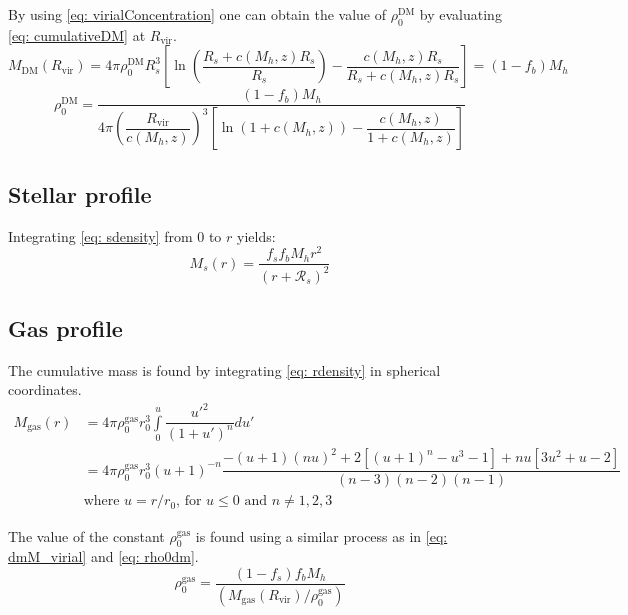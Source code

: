 		By using \autoref{eq: virialConcentration} one can obtain the value of $\rho_0^\text{DM}$ by evaluating \autoref{eq: cumulativeDM} at $R_\text{vir}$.
		\begin{equation}\label{eq: dmM_virial}
		M_\text{DM}(R_\text{vir}) = 4\pi\rho_0^\text{DM}R_s^3 \left[\ln\left(\dfrac{R_s + c(M_h, z)R_s}{R_s}\right) - \dfrac{c(M_h, z)R_s}{R_s + c(M_h, z)R_s}\right] = (1 - f_b)M_h
		\end{equation}
		\begin{equation}\label{eq: rho0dm}
		\rho_0^\text{DM} = \dfrac{(1 - f_b)M_h}{4\pi \left(\dfrac{R_\text{vir}}{c(M_h, z)}\right)^3 \left[\ln\left(1 + c(M_h, z)\right) - \dfrac{c(M_h, z)}{1 + c(M_h, z)}\right]}
		\end{equation}
	
	\subsection{Stellar profile}		
		Integrating \autoref{eq: sdensity} from $0$ to $r$ yields:
		\begin{equation}
			M_s(r) = \dfrac{f_sf_bM_h r^2}{(r + \mathcal{R}_s)^2}
		\end{equation}
	
	\subsection{Gas profile}		
		The cumulative mass is found by integrating \autoref{eq: rdensity} in spherical coordinates.
		\begin{equation}
			\begin{array}{rl}
			M_\text{gas}(r) 
			& = 4\pi\rho_0^\text{gas} r_0^3\int\limits_{0}^{u}\dfrac{u'^2}{(1 + u')^n}du' \\
			& = 4\pi\rho_0^\text{gas} r_0^3\left(u + 1\right)^{-n}\dfrac{-(u + 1)(nu)^2 + 2[(u + 1)^n - u^3-1] + nu[3u^2 + u - 2]}{(n - 3)(n - 2)(n - 1)}
			\\
			& \text{where $u = r/r_0$, for $u \leq 0$ and $n \neq {1, 2, 3}$}
			\end{array}
		\end{equation}
		
		The value of the constant $\rho_0^\text{gas}$ is found using a similar process as in \autoref{eq: dmM_virial} and \ref{eq: rho0dm}.
		\begin{equation}
			\rho_0^\text{gas} = \dfrac{(1 - f_s) f_bM_h}{(M_\text{gas}(R_\text{vir}) / \rho_0^\text{gas})}
		\end{equation}
		
